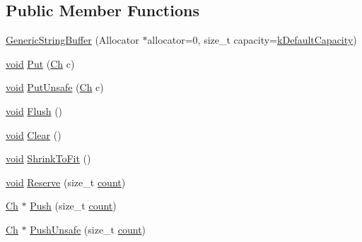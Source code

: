 \subsection*{Public Member Functions}
\begin{DoxyCompactItemize}
\item 
\hyperlink{classGenericStringBuffer_a62f5ea1a53a2a3f98088f8c152b6183e}{Generic\+String\+Buffer} (Allocator $\ast$allocator=0, size\+\_\+t capacity=\hyperlink{classGenericStringBuffer_ae74f9df854dd5a7db4315ef44b016d22}{k\+Default\+Capacity})
\item 
\hyperlink{imgui__impl__opengl3__loader_8h_ac668e7cffd9e2e9cfee428b9b2f34fa7}{void} \hyperlink{classGenericStringBuffer_a8be5c8fadccacdcf40e20220f38e0afa}{Put} (\hyperlink{classGenericStringBuffer_a735b75db076ffe86d0d294be49655d46}{Ch} c)
\item 
\hyperlink{imgui__impl__opengl3__loader_8h_ac668e7cffd9e2e9cfee428b9b2f34fa7}{void} \hyperlink{classGenericStringBuffer_a9225468d11fdddfc3a9a4e48bf4d3ba4}{Put\+Unsafe} (\hyperlink{classGenericStringBuffer_a735b75db076ffe86d0d294be49655d46}{Ch} c)
\item 
\hyperlink{imgui__impl__opengl3__loader_8h_ac668e7cffd9e2e9cfee428b9b2f34fa7}{void} \hyperlink{classGenericStringBuffer_a28bb539487db17b07314a532f3b8847c}{Flush} ()
\item 
\hyperlink{imgui__impl__opengl3__loader_8h_ac668e7cffd9e2e9cfee428b9b2f34fa7}{void} \hyperlink{classGenericStringBuffer_a42f15c959046d899cb74c3120a6995f9}{Clear} ()
\item 
\hyperlink{imgui__impl__opengl3__loader_8h_ac668e7cffd9e2e9cfee428b9b2f34fa7}{void} \hyperlink{classGenericStringBuffer_a0dbdb77489b95923795011a24f705be5}{Shrink\+To\+Fit} ()
\item 
\hyperlink{imgui__impl__opengl3__loader_8h_ac668e7cffd9e2e9cfee428b9b2f34fa7}{void} \hyperlink{classGenericStringBuffer_a4d6becae201b98c122746298882a318f}{Reserve} (size\+\_\+t \hyperlink{imgui__impl__opengl3__loader_8h_a619bc20e8198de3bd3f3d7fc34de66b2}{count})
\item 
\hyperlink{classGenericStringBuffer_a735b75db076ffe86d0d294be49655d46}{Ch} $\ast$ \hyperlink{classGenericStringBuffer_a49fd10cdd5dd97a4cf9813d01334d660}{Push} (size\+\_\+t \hyperlink{imgui__impl__opengl3__loader_8h_a619bc20e8198de3bd3f3d7fc34de66b2}{count})
\item 
\hyperlink{classGenericStringBuffer_a735b75db076ffe86d0d294be49655d46}{Ch} $\ast$ \hyperlink{classGenericStringBuffer_a4e396f55323ca54f949685c7c6ef2060}{Push\+Unsafe} (size\+\_\+t \hyperlink{imgui__impl__opengl3__loader_8h_a619bc20e8198de3bd3f3d7fc34de66b2}{count})

\end{DoxyCompactItemize}
